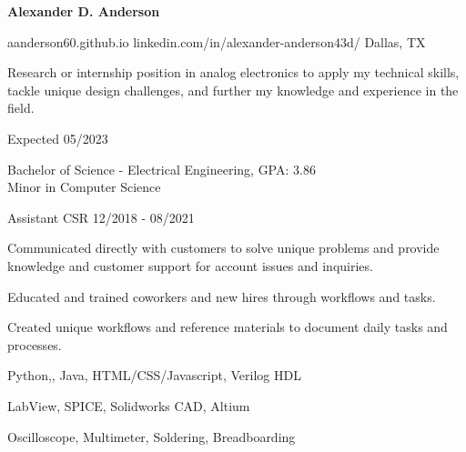 \documentclass[11pt]{article}
\begin{document}
\centerline{{\Huge \bf Alexander D. Anderson}}

\bigskip

        {aanderson60.github.io}
        {linkedin.com/in/alexander-anderson43d/}
        {Dallas, TX}

Research or internship position in analog electronics to apply my technical skills, tackle unique design challenges, and further my knowledge and experience in the field.


\begin{description}
\squish
{}
            {}
            {Expected 05/2023}

Bachelor of Science - Electrical Engineering, GPA: 3.86\\
Minor in Computer Science 

\end{description}


\begin{description}
\squish

           {Assistant CSR}
           {12/2018 - 08/2021}

Communicated directly with customers to solve unique problems and provide knowledge and
customer support for account issues and inquiries.

Educated and trained coworkers and new hires through workflows and tasks.

Created unique workflows and reference materials to document daily tasks and processes.

\end{description}


      {Python,\CPP, Java, HTML/CSS/Javascript, Verilog HDL}

      {LabView, SPICE, Solidworks CAD, Altium}

      {Oscilloscope, Multimeter, Soldering, Breadboarding}

\end{document}
